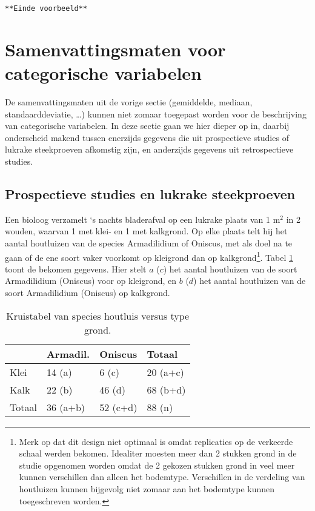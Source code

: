 \documentclass[12pt,dutch,coursenotes]{book}
\let\rmarkdownfootnote\footnote%
\def\footnote{\protect\rmarkdownfootnote}
\theoremstyle{definition}
\theoremstyle{definition}
\theoremstyle{definition}
\theoremstyle{remark}
\let\BeginKnitrBlock\begin \let\EndKnitrBlock\end
\begin{document}
\texttt{**Einde\ voorbeeld**}

\section{Samenvattingsmaten voor categorische
variabelen}\label{sec:explCatVar}

De samenvattingsmaten uit de vorige sectie (gemiddelde, mediaan,
standaarddeviatie, \ldots{}) kunnen niet zomaar toegepast worden voor de
beschrijving van categorische variabelen. In deze sectie gaan we hier
dieper op in, daarbij onderscheid makend tussen enerzijds gegevens die
uit prospectieve studies of lukrake steekproeven afkomstig zijn, en
anderzijds gegevens uit retrospectieve studies.

\subsection{Prospectieve studies en lukrake
steekproeven}\label{prospectieve-studies-en-lukrake-steekproeven}

\BeginKnitrBlock{example}[Houtluizen]
\protect\hypertarget{exm:unnamed-chunk-55}{}{\label{exm:unnamed-chunk-55}
\iffalse (Houtluizen) \fi{} }
\EndKnitrBlock{example}

Een bioloog verzamelt `s nachts bladerafval op een lukrake plaats van 1
m\(^2\) in 2 wouden, waarvan 1 met klei- en 1 met kalkgrond. Op elke
plaats telt hij het aantal houtluizen van de species Armadilidium of
Oniscus, met als doel na te gaan of de ene soort vaker voorkomt op
kleigrond dan op kalkgrond\footnote{Merk op dat dit design niet optimaal
  is omdat replicaties op de verkeerde schaal werden bekomen. Idealiter
  moesten meer dan 2 stukken grond in de studie opgenomen worden omdat
  de 2 gekozen stukken grond in veel meer kunnen verschillen dan alleen
  het bodemtype. Verschillen in de verdeling van houtluizen kunnen
  bijgevolg niet zomaar aan het bodemtype kunnen toegeschreven worden.}.
Tabel \ref{tab:cox} toont de bekomen gegevens. Hier stelt \(a\) (\(c\))
het aantal houtluizen van de soort Armadilidium (Oniscus) voor op
kleigrond, en \(b\) (\(d\)) het aantal houtluizen van de soort
Armadilidium (Oniscus) op kalkgrond.

\begin{table}

\caption{\label{tab:cox}Kruistabel van species houtluis versus type grond.}
\centering
\begin{tabular}[t]{llll}
\toprule
  & Armadil. & Oniscus & Totaal\\
\midrule
Klei & 14 (a) & 6 (c) & 20 (a+c)\\
Kalk & 22 (b) & 46 (d) & 68 (b+d)\\
Totaal & 36 (a+b) & 52 (c+d) & 88 (n)\\
\bottomrule
\end{tabular}
\end{table}
\end{document}
